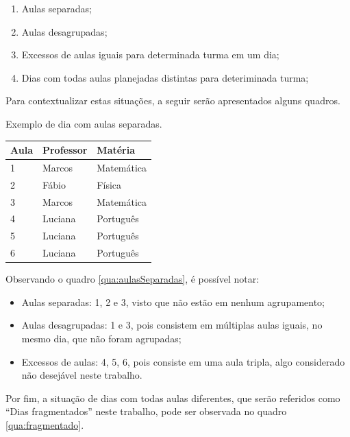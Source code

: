 \begin{enumerate}
	\item Aulas separadas;
	\item Aulas desagrupadas;
	\item Excessos de aulas iguais para determinada turma em um dia;
	\item Dias com todas aulas planejadas distintas para deteriminada turma;
\end{enumerate}

Para contextualizar estas situações, a seguir serão apresentados alguns quadros.

\begin{quadro}[!htb]
	\centering
	\caption{Exemplo de dia com aulas separadas.\label{qua:aulasSeparadas}}
	\begin{tabular}{|p{3cm}|p{3cm}|p{3cm}|}
		\hline
		\textbf{Aula} & \textbf{Professor} & \textbf{Matéria} \\
		\hline
		1 & Marcos & Matemática \\
		\hline
		2 & Fábio & Física \\
		\hline
		3 & Marcos & Matemática \\
		\hline
		4 & Luciana & Português \\
		\hline
		5 & Luciana & Português \\
		\hline
		6 & Luciana & Português \\
		\hline
	\end{tabular}
\end{quadro}
\pagebreak

Observando o quadro \ref{qua:aulasSeparadas}, é possível notar:

\begin{itemize}
	\item Aulas separadas: 1, 2 e 3, visto que não estão em nenhum agrupamento;
	\item Aulas desagrupadas: 1 e 3, pois consistem em múltiplas aulas iguais, no mesmo dia, que não foram agrupadas;
	\item Excessos de aulas: 4, 5, 6, pois consiste em uma aula tripla, algo considerado não desejável neste trabalho.
\end{itemize}

Por fim, a situação de dias com todas aulas diferentes, que serão referidos como ``Dias fragmentados'' neste trabalho, pode ser observada no quadro \ref{qua:fragmentado}.

